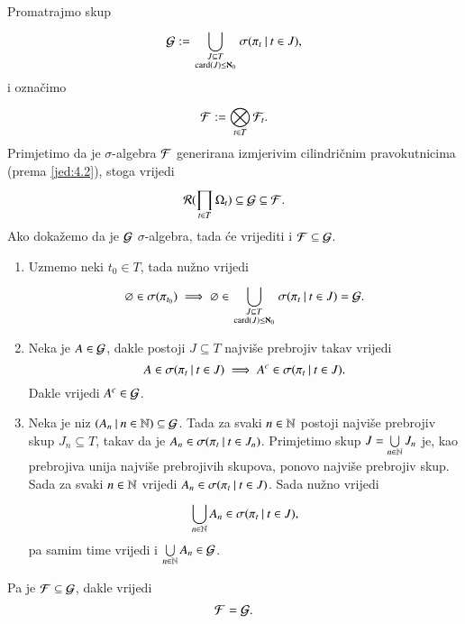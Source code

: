 \begin{rj}
    Promatrajmo skup
    \begin{equation*}
        \mathcal{G} := \bigcup\limits_{
            \begin{smallmatrix}
                J \subseteq T\\
                \textnormal{card}({J}) \leq \aleph_0
            \end{smallmatrix}
        }^{} \sigma({\pi_t} \: | \: {t \in J}),
    \end{equation*}
    i ozna\v cimo
    \begin{equation*}
        \mathcal{F} := \bigotimes\limits_{t \in T}^{} \mathcal{F}_t.
    \end{equation*}
    Primjetimo da je $\sigma$-algebra $\mathcal{F}$ generirana izmjerivim cilindri\v cnim pravokutnicima (prema \eqref{jed:4.2}), stoga vrijedi
    \begin{equation*}
        \mathcal{R}({\prod\limits_{t \in T}^{} \Omega_t}) \subseteq \mathcal{G} \subseteq \mathcal{F}.
    \end{equation*}
    Ako doka\v zemo da je $\mathcal{G}$ $\sigma$-algebra, tada \' ce vrijediti i $\mathcal{F} \subseteq \mathcal{G}$.
    \begin{enumerate}[label=(\roman*)]
        \item Uzmemo neki $t_0 \in T$, tada nu\v zno vrijedi
        \begin{equation*}
            \varnothing \in \sigma({\pi_{t_0}}) \implies \varnothing \in \bigcup\limits_{
                \begin{smallmatrix}
                    J \subseteq T\\
                    \textnormal{card}({J}) \leq \aleph_0
                \end{smallmatrix}
            }^{} \sigma({\pi_t} \: | \: {t \in J}) = \mathcal{G}.
        \end{equation*}
        \item Neka je $A \in \mathcal{G}$, dakle postoji $J \subseteq T$ najvi\v se prebrojiv takav vrijedi
        \begin{equation*}
            A \in \sigma({\pi_t} \: | \: {t \in J}) \implies A^c \in \sigma({\pi_t} \: | \: {t \in J}).
        \end{equation*}
        Dakle vrijedi $A^c \in \mathcal{G}$.
        \item Neka je niz $({A_n} \: | \: {n \in \mathbb{N}}) \subseteq \mathcal{G}$.
        Tada za svaki $n \in \mathbb{N}$ postoji najvi\v se prebrojiv skup $J_n \subseteq T$, takav da je $A_n \in \sigma({\pi_t} \: | \: {t \in J_n})$.
        Primjetimo skup $J = \bigcup\limits_{n \in \mathbb{N}}^{} J_n$ je, kao prebrojiva unija najvi\v se prebrojivih skupova, ponovo najvi\v se prebrojiv skup.
        Sada za svaki $n \in \mathbb{N}$ vrijedi $A_n \in \sigma({\pi_t} \: | \: {t \in J})$.
        Sada nu\v zno vrijedi
        \begin{equation*}
            \bigcup\limits_{n \in \mathbb{N}}^{} A_n \in \sigma({\pi_t} \: | \: {t \in J}),
        \end{equation*}
        pa samim time vrijedi i $\bigcup\limits_{n \in \mathbb{N}}^{} A_n \in \mathcal{G}$.
    \end{enumerate}
    Pa je $\mathcal{F} \subseteq \mathcal{G}$, dakle vrijedi
    \begin{equation*}
        \mathcal{F} = \mathcal{G}.
    \end{equation*}
\end{rj}

